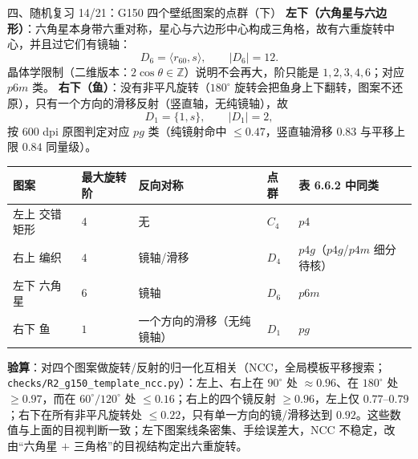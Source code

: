 \documentclass[aspectratio=169,10pt,fontset=none]{ctexbeamer}
\newcommand{\key}[1]{\textcolor{ink}{\bfseries #1}}
\begin{document}
\begin{frame}[t]{四、随机复习 14/21：G150 四个壁纸图案的点群（下）}
\scriptsize
\key{左下（六角星与六边形）}：六角星本身带六重对称，星心与六边形中心构成三角格，故有六重旋转中心，并且过它们有镜轴：
\[ D_6=\langle r_{60},s\rangle,\qquad |D_6|=12. \]
晶体学限制（二维版本：$2\cos\theta\in\mathbb Z$）说明不会再大，阶只能是 $1,2,3,4,6$；对应 $p6m$ 类。
\key{右下（鱼）}：没有非平凡旋转（$180^\circ$ 旋转会把鱼身上下翻转，图案不还原），只有一个方向的滑移反射（竖直轴，无纯镜轴），故
\[ D_1=\{1,s\},\qquad |D_1|=2, \]
按 600 dpi 原图判定对应 $pg$ 类（纯镜射命中 $\le0.47$，竖直轴滑移 $0.83$ 与平移上限 $0.84$ 同量级）。
\begin{center}
{\scriptsize
\begin{tabular}{@{}lllll@{}}
\toprule
图案 & 最大旋转阶 & 反向对称 & 点群 & 表 6.6.2 中同类 \\
\midrule
左上 交错矩形 & $4$ & 无 & $C_4$ & $p4$ \\
右上 编织 & $4$ & 镜轴/滑移 & $D_4$ & $p4g$（$p4g$/$p4m$ 细分待核） \\
左下 六角星 & $6$ & 镜轴 & $D_6$ & $p6m$ \\
右下 鱼 & $1$ & 一个方向的滑移（无纯镜轴） & $D_1$ & $pg$ \\
\bottomrule
\end{tabular}}
\end{center}
\key{验算}：对四个图案做旋转/反射的归一化互相关（NCC，全局模板平移搜索；\texttt{checks/R2\_g150\_template\_ncc.py}）：左上、右上在 $90^\circ$ 处 $\approx0.96$、在 $180^\circ$ 处 $\ge0.97$，而在 $60^\circ/120^\circ$ 处 $\le0.16$；右上的四个镜反射 $\ge0.96$，左上仅 $0.77$--$0.79$；右下在所有非平凡旋转处 $\le0.22$，只有单一方向的镜/滑移达到 $0.92$。这些数值与上面的目视判断一致；左下图案线条密集、手绘误差大，NCC 不稳定，改由“六角星 $+$ 三角格”的目视结构定出六重旋转。
\end{frame}

\end{document}
